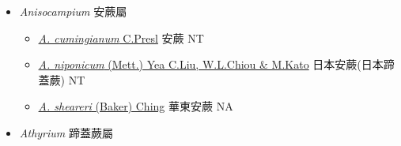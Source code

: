 
  \begin{itemize}
 \item[] \textit{Anisocampium} 安蕨屬
                    
  \begin{itemize}
        \item[] \href{http://www.theplantlist.org/tpl1.1/search?q=Anisocampium+cumingianum}{\textit{A. cumingianum} C.Presl}   安蕨 NT
        \item[] \href{http://www.theplantlist.org/tpl1.1/search?q=Anisocampium+niponicum}{\textit{A. niponicum} (Mett.) Yea C.Liu, W.L.Chiou \& M.Kato}     日本安蕨(日本蹄蓋蕨)   NT
        \item[] \href{http://www.theplantlist.org/tpl1.1/search?q=Anisocampium+sheareri}{\textit{A. sheareri} (Baker) Ching}   華東安蕨 NA 
  \end{itemize}
 \item[] \textit{Athyrium} 蹄蓋蕨屬
                    

\end{itemize}
